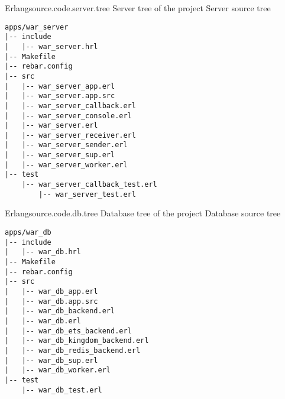 \begin{scode}{Erlang}{source.code.server.tree}{%
  Server tree of the project}{%
  Server source tree}
  \begin{lstlisting}
apps/war_server
|-- include
|   |-- war_server.hrl
|-- Makefile
|-- rebar.config
|-- src
|   |-- war_server_app.erl
|   |-- war_server.app.src
|   |-- war_server_callback.erl
|   |-- war_server_console.erl
|   |-- war_server.erl
|   |-- war_server_receiver.erl
|   |-- war_server_sender.erl
|   |-- war_server_sup.erl
|   |-- war_server_worker.erl
|-- test
    |-- war_server_callback_test.erl
        |-- war_server_test.erl
  \end{lstlisting}
\end{scode}

\begin{scode}{Erlang}{source.code.db.tree}{%
  Database tree of the project}{%
  Database source tree}
  \begin{lstlisting}
apps/war_db
|-- include
|   |-- war_db.hrl
|-- Makefile
|-- rebar.config
|-- src
|   |-- war_db_app.erl
|   |-- war_db.app.src
|   |-- war_db_backend.erl
|   |-- war_db.erl
|   |-- war_db_ets_backend.erl
|   |-- war_db_kingdom_backend.erl
|   |-- war_db_redis_backend.erl
|   |-- war_db_sup.erl
|   |-- war_db_worker.erl
|-- test
    |-- war_db_test.erl
  \end{lstlisting}
\end{scode}


